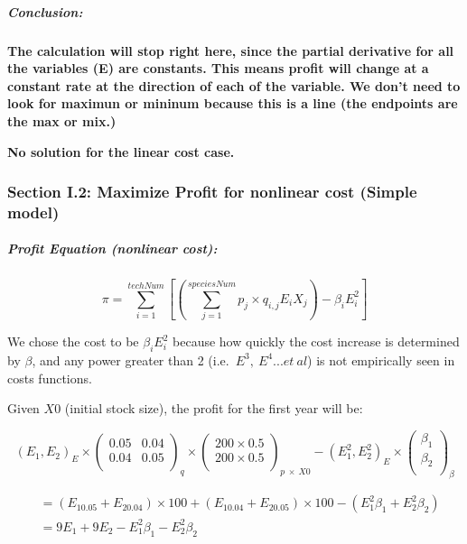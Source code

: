 \documentclass[
]{article}
\begin{document}
\hypertarget{conclusion}{%
\subparagraph{\texorpdfstring{\textbf{Conclusion:}}{Conclusion:}}\label{conclusion}}

\textbf{The calculation will stop right here, since the partial
derivative for all the variables (E) are constants. This means profit
will change at a constant rate at the direction of each of the variable.
We don't need to look for maximun or mininum because this is a line (the
endpoints are the max or mix.)}

\textbf{No solution for the linear cost case.}

\hypertarget{section-i.2-maximize-profit-for-nonlinear-cost-simple-model}{%
\subsubsection{Section I.2: Maximize Profit for nonlinear cost (Simple
model)}\label{section-i.2-maximize-profit-for-nonlinear-cost-simple-model}}

\hypertarget{profit-equation-nonlinear-cost}{%
\subparagraph{\texorpdfstring{\textbf{Profit Equation (nonlinear
cost):}}{Profit Equation (nonlinear cost):}}\label{profit-equation-nonlinear-cost}}

\[\pi = \sum_{i=1}^{techNum}[(\sum_{j=1}^{speciesNum} p_j \times q_{i,j}E_iX_{j}) - \beta_iE_i^2]
\]

We chose the cost to be \(\beta_iE_i^2\) because how quickly the cost
increase is determined by \(\beta\), and any power greater than 2
(i.e.~\(E^3, \ E^4...et \ al\)) is not empirically seen in costs
functions.

Given \(X0\) (initial stock size), the profit for the first year will
be:

\[
(E_1, E_2)_{E}
\times 
\begin{pmatrix}
0.05&0.04\\
0.04&0.05\\
\end{pmatrix}_q
\times 
\begin{pmatrix}
200 \times 0.5\\
200 \times 0.5\\
\end{pmatrix}_{p \ \times \ X0}
-
(E_1^2, E_2^2)_{E}
\times 
\begin{pmatrix}
{\beta_1}\\
{\beta_2}\\
\end{pmatrix}_{\beta}
\]

\[\begin{align}
&=(E_10.05+E_20.04)\times 100 + (E_10.04+E_20.05)\times 100 - (E_1^2{\beta_1} + E_2^2{\beta_2})\\
&= 9E_1+9E_2-E_1^2{\beta_1} - E_2^2{\beta_2}\\
\end{align}
\]
\end{document}
